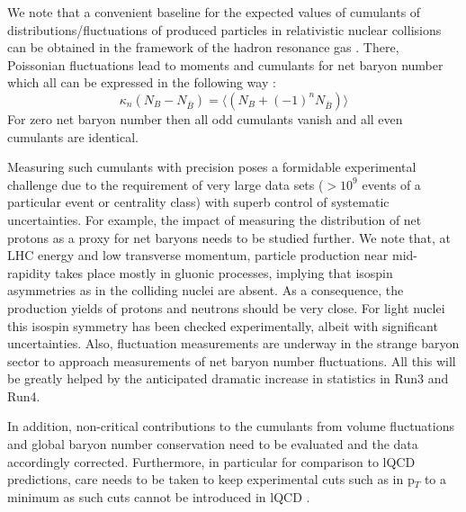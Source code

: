 We note that a convenient baseline for the expected values of cumulants of distributions/fluctuations of produced particles in relativistic nuclear collisions can be obtained in the framework of the hadron re\-so\-nance gas \cite{Allton:2005gk,Karsch:2010ck,BraunMunzinger:2011ta,Borsanyi:2018grb,Luo:2017faz}. There, Poissonian fluctuations lead to moments and cumulants for net baryon number which all can be expressed in the following way \cite{BraunMunzinger:2011ta,BraunMunzinger:2011dn, Braun-Munzinger:2018yru}:
\begin{equation}
\label{lbaseline}
\kappa_n(N_B - N_{\bar B}) = \langle (N_B +(-1)^n N_{\bar{B}}) \rangle
\end{equation}
For zero net baryon number then all odd cumulants vanish and all even cumulants are identical.

Measuring such cumulants with precision poses a formidable experimental challenge due to the requirement of very large data sets ($> 10^9$ events of a particular event or centrality class) with superb control of systematic uncertainties. For example, the impact of measuring the distribution of net protons as a proxy for net baryons needs to be studied further. We note that, at LHC energy and low transverse momentum, particle production near mid-rapidity takes place mostly in gluonic processes, implying that isospin asymmetries as in the colliding nuclei are absent. As a consequence, the production yields of protons and neutrons should be very close. For light nuclei this isospin symmetry has been checked experimentally, albeit with significant uncertainties. Also, fluctuation measurements  are underway in the strange baryon sector to approach measurements of net baryon number fluctuations. All this will be greatly helped by the anticipated dramatic increase in statistics in Run3 and Run4.

In addition, non-critical contributions to the cumulants from volume fluctuations and global baryon number conservation \cite{Skokov:2012ds,Braun-Munzinger:2016yjz, Braun-Munzinger:2018yru} need to be evaluated and the data accordingly corrected. Furthermore, in particular for comparison to lQCD predictions, care needs to be taken to keep experimental cuts such as in p$_T$ to a minimum as such cuts cannot be introduced in lQCD \cite{Karsch:2015zna,Alba:2015iva}.


